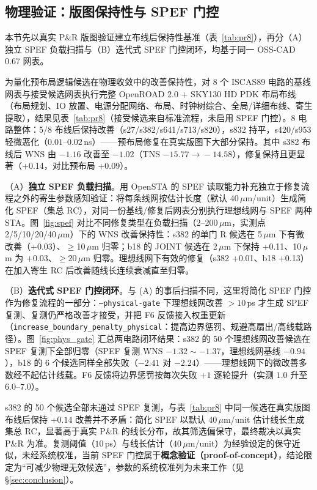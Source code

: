 \documentclass[journal]{IEEEtran}
\begin{document}
\subsection{物理验证：版图保持性与 SPEF 门控}\label{sec:phys_closure}

本节先以真实 P\&R 版图验证建立布线后保持性基准（表~\ref{tab:pr8}），再分（A）独立 SPEF 负载扫描与（B）迭代式 SPEF 门控闭环，均基于同一 OSS-CAD 0.67 网表。

为量化预布局逻辑候选在物理收敛中的改善保持性，对 8 个 ISCAS89 电路的基线网表与接受候选网表执行完整 OpenROAD 2.0 + SKY130 HD PDK 布局布线（布局规划、IO 放置、电源分配网络、布局、时钟树综合、全局/详细布线、寄生提取），结果见表~\ref{tab:pr8}（接受候选来自标准流程，未启用 SPEF 门控）。8 电路整体：5/8 布线后保持改善（s27/s382/s641/s713/s820），s832 持平，s420/s953 轻微恶化（$0.01$--$0.02\,$ns）——预布局修复在真实版图下大部分保持。其中 s382 布线后 WNS 由 $-1.16$ 改善至 $-1.02$（TNS $-15.77\!\rightarrow\!-14.58$），修复保持且更显著（+0.14，对比预布局 +0.09）。

（A）\textbf{独立 SPEF 负载扫描}。用 OpenSTA 的 SPEF 读取能力补充独立于修复流程之外的寄生参数感知验证：将每条线网按估计长度（默认 40\,$\mu$m/unit）生成简化 SPEF（集总 RC），对同一份基线/修复后网表分别执行理想线网与 SPEF 两种 STA。图~\ref{fig:spef} 对比不同修复类型在负载扫描（2--200\,$\mu$m，实测点 2/5/10/20/40\,$\mu$m）下的 WNS 改善保持性：s382 的单门 R 候选在 5\,$\mu$m 下有微改善（+0.03）、$\ge$10\,$\mu$m 归零；b18 的 JOINT 候选在 2\,$\mu$m 下保持 +0.11、10\,$\mu$m 为 +0.03、$\ge$20\,$\mu$m 归零。理想线网下有效的修复（s382 +0.01、b18 +0.13）在加入寄生 RC 后改善随线长连续衰减直至归零。

（B）\textbf{迭代式 SPEF 门控闭环}。与 (A) 的事后扫描不同，这里将简化 SPEF 门控作为修复流程的一部分：\texttt{--physical-gate} 下理想线网改善 $>10\,$ps 才生成 SPEF 复测、复测仍严格改善才接受，并把 F6 反馈接入权重更新（\texttt{increase\_boundary\_penalty\_physical}：提高边界惩罚、规避高扇出/高线载路径）。图~\ref{fig:phys_gate} 汇总两电路闭环结果：s382 的 50 个理想线网改善候选在 SPEF 复测下全部归零（SPEF 复测 WNS $-1.32\sim-1.37$，理想线网基线 $-0.94$），b18 的 6 个候选同样全部失败（$-2.41$ 对 $-2.24$）——理想线网下的微改善多数经不起估计线载。F6 反馈将边界惩罚按每次失败 $+1$ 逐轮提升（实测 $1.0$ 升至 $6.0$--$7.0$）。

s382 的 50 个候选全部未通过 SPEF 复测，与表~\ref{tab:pr8} 中同一候选在真实版图布线后保持 $+0.14$ 改善并不矛盾：简化 SPEF 以默认 40\,$\mu$m/unit 估计线长生成集总 RC，显著高于真实 P\&R 的线长分布，故其筛选偏保守，最终裁决以真实 P\&R 为准。复测阈值（$10\,$ps）与线长估计（$40\,\mu$m/unit）为经验设定的保守近似，未经系统校准，当前 SPEF 门控属于\textbf{概念验证（proof-of-concept）}，结论限定为“可减少物理无效候选”，参数的系统校准列为未来工作（见 \S\ref{sec:conclusion}）。
\end{document}
